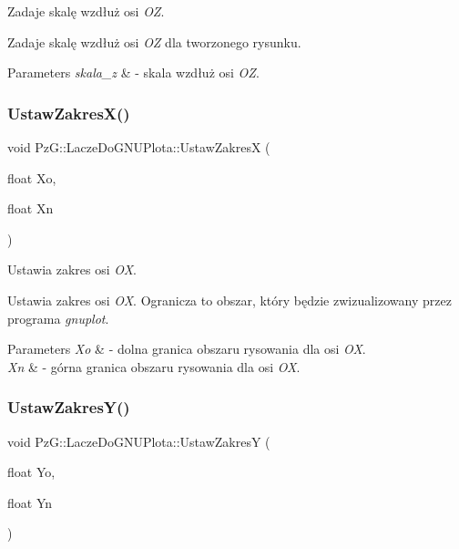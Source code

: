 Zadaje skalę wzdłuż osi {\itshape OZ}. 

Zadaje skalę wzdłuż osi {\itshape OZ} dla tworzonego rysunku. 
\begin{DoxyParams}{Parameters}
{\em skala\+\_\+z} & -\/ skala wzdłuż osi {\itshape OZ}. \\
\hline
\end{DoxyParams}
\mbox{\label{classPzG_1_1LaczeDoGNUPlota_a9c91987dfc869d6fcea96205c581daef}} 
\subsubsection{\texorpdfstring{Ustaw\+Zakres\+X()}{UstawZakresX()}}
{\footnotesize\ttfamily void Pz\+G\+::\+Lacze\+Do\+G\+N\+U\+Plota\+::\+Ustaw\+ZakresX (\begin{DoxyParamCaption}\item[{float}]{Xo,  }\item[{float}]{Xn }\end{DoxyParamCaption})\hspace{0.3cm}{\ttfamily [inline]}}



Ustawia zakres osi {\itshape OX}. 

Ustawia zakres osi {\itshape OX}. Ogranicza to obszar, który będzie zwizualizowany przez programa {\itshape gnuplot}. 
\begin{DoxyParams}{Parameters}
{\em Xo} & -\/ dolna granica obszaru rysowania dla osi {\itshape OX}. \\
\hline
{\em Xn} & -\/ górna granica obszaru rysowania dla osi {\itshape OX}. \\
\hline
\end{DoxyParams}
\mbox{\label{classPzG_1_1LaczeDoGNUPlota_a54c6e9cf9ab2eae479451fd953c2717c}} 
\subsubsection{\texorpdfstring{Ustaw\+Zakres\+Y()}{UstawZakresY()}}
{\footnotesize\ttfamily void Pz\+G\+::\+Lacze\+Do\+G\+N\+U\+Plota\+::\+Ustaw\+ZakresY (\begin{DoxyParamCaption}\item[{float}]{Yo,  }\item[{float}]{Yn }\end{DoxyParamCaption})\hspace{0.3cm}{\ttfamily [inline]}}



